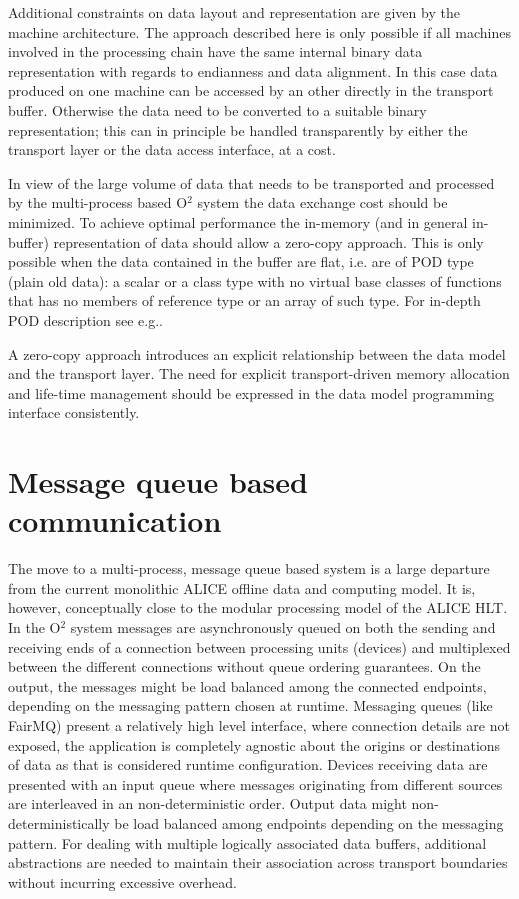 \documentclass[a4paper,twoside]{article}
\def\O2{O$^2$}
\begin{document}
Additional constraints on data layout and representation are given by the machine architecture. The approach described here is only possible if all machines involved in the processing chain have the same internal binary data representation with regards to endianness and data alignment. In this case data produced on one machine can be accessed by an other directly in the transport buffer. Otherwise the data need to be converted to a suitable binary representation; this can in principle be handled transparently by either the transport layer or the data access interface, at a cost.

In view of the large volume of data that needs to be transported and processed by the multi-process based \O2 system the data exchange cost should be minimized. To achieve optimal performance the in-memory (and in general in-buffer) representation of data should allow a zero-copy approach. This is only possible when the data contained in the buffer are flat, i.e. are of POD type (plain old data): a scalar or a class type with no virtual base classes of functions that has no members of reference type or an array of such type. For in-depth POD description see e.g.\cite{POD}.

A zero-copy approach introduces an explicit relationship between the data model and the transport layer. The need for explicit transport-driven memory allocation and life-time management should be expressed in the data model programming interface consistently.

\section{Message queue based communication}
The move to a multi-process, message queue based system is a large departure from the current monolithic ALICE offline data and computing model. It is, however, conceptually close to the modular processing model of the ALICE HLT.
In the \O2 system messages are asynchronously queued on both the sending and receiving ends of a connection between processing units (devices) and multiplexed between the different connections without queue ordering guarantees. On the output, the messages might be load balanced among the connected endpoints, depending on the messaging pattern chosen at runtime.
Messaging queues (like FairMQ) present a relatively high level interface, where connection details are not exposed, the application is completely agnostic about the origins or destinations of data as that is considered runtime configuration.
Devices receiving data are presented with an input queue where messages originating from different sources are interleaved in an non-deterministic order. Output data might non-deterministically be load balanced among endpoints depending on the messaging pattern.
For dealing with multiple logically associated data buffers, additional abstractions are needed to maintain their association across transport boundaries without incurring excessive overhead.
\end{document}
